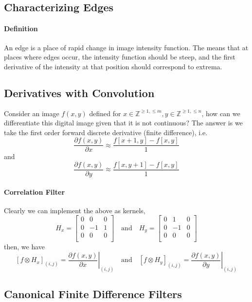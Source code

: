 \documentclass[11pt]{article}
\begin{document}
\subsection{Characterizing Edges}
\paragraph{Definition} An edge is a place of rapid change in image intensity function. The means that at places where edges occur, the intensity function should be steep, and the first derivative of the intensity at that position should correspond to extrema. 

\subsection{Derivatives with Convolution}
Consider an image $f(x, y)$ defined for $x\in \mathbb Z ^{\geq 1, \leq m}, y \in \mathbb Z ^{\geq 1 , \leq n}$, how can we differentiate this digital image given that it is not continuous? The answer is we take the first order forward discrete derivative (finite difference), i.e. 
\begin{equation}
\frac{\partial f(x, y)}{\partial x} \approx \frac{f[x+1, y] - f[x, y]}{1}
\end{equation}
and
\begin{equation}
\frac{\partial f(x, y)}{\partial y} \approx \frac{f[x, y + 1] - f[x, y]}{1}
\end{equation}

\paragraph{Correlation Filter}
Clearly we can implement the above as kernels, 
\begin{equation}
H_x = \begin{bmatrix}
	0 & 0 & 0 \\	
	0 & -1 & 1 \\
	0 & 0 & 0 \\
\end{bmatrix} \quad \text{and} \quad H_y = \begin{bmatrix}
	0 & 1 & 0 \\	
	0 & -1 & 0 \\
	0 & 0 & 0 \\
\end{bmatrix}
\end{equation}
then, we have
\begin{equation}
\left[ f \otimes H_x \right]_{(i, j)} = \left. \frac{\partial f(x, y)}{\partial x}\right|_{(i, j)} 
\quad \text{and} \quad 
\left[ f \otimes H_y \right]_{(i, j)} = \left. \frac{\partial f(x, y)}{\partial y}\right|_{(i, j)} 
\end{equation}

\subsection{Canonical Finite Difference Filters}
\end{document}
